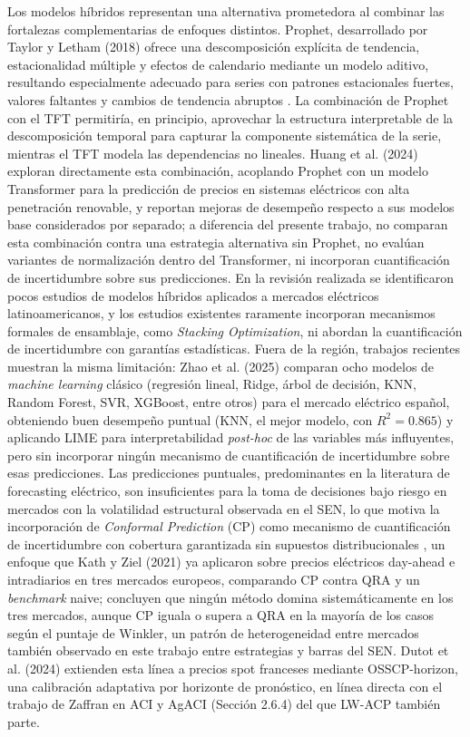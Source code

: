 Los modelos híbridos representan una alternativa prometedora al combinar las fortalezas complementarias de enfoques distintos. Prophet, desarrollado por Taylor y Letham (2018) \cite{Prophet} ofrece una descomposición explícita de tendencia, estacionalidad múltiple y efectos de calendario mediante un modelo aditivo, resultando especialmente adecuado para series con patrones estacionales fuertes, valores faltantes y cambios de tendencia abruptos \cite{Prophet}. La combinación de Prophet con el TFT permitiría, en principio, aprovechar la estructura interpretable de la descomposición temporal para capturar la componente sistemática de la serie, mientras el TFT modela las dependencias no lineales. Huang et al. (2024) \cite{ProphetTransformers} exploran directamente esta combinación, acoplando Prophet con un modelo Transformer para la predicción de precios en sistemas eléctricos con alta penetración renovable, y reportan mejoras de desempeño respecto a sus modelos base considerados por separado; a diferencia del presente trabajo, no comparan esta combinación contra una estrategia alternativa sin Prophet, no evalúan variantes de normalización dentro del Transformer, ni incorporan cuantificación de incertidumbre sobre sus predicciones. En la revisión realizada se identificaron pocos estudios de modelos híbridos aplicados a mercados eléctricos latinoamericanos, y los estudios existentes raramente incorporan mecanismos formales de ensamblaje, como \textit{Stacking Optimization}, ni abordan la cuantificación de incertidumbre con garantías estadísticas. Fuera de la región, trabajos recientes muestran la misma limitación: Zhao et al. (2025) \cite{Zhao2025LIME} comparan ocho modelos de \textit{machine learning} clásico (regresión lineal, Ridge, árbol de decisión, KNN, Random Forest, SVR, XGBoost, entre otros) para el mercado eléctrico español, obteniendo buen desempeño puntual (KNN, el mejor modelo, con $R^2=0.865$) y aplicando LIME para interpretabilidad \textit{post-hoc} de las variables más influyentes, pero sin incorporar ningún mecanismo de cuantificación de incertidumbre sobre esas predicciones. Las predicciones puntuales, predominantes en la literatura de forecasting eléctrico, son insuficientes para la toma de decisiones bajo riesgo en mercados con la volatilidad estructural observada en el SEN, lo que motiva la incorporación de \textit{Conformal Prediction} (CP) como mecanismo de cuantificación de incertidumbre con cobertura garantizada sin supuestos distribucionales \cite{ConformalPrediction}, un enfoque que Kath y Ziel (2021) \cite{KathZiel2021} ya aplicaron sobre precios eléctricos day-ahead e intradiarios en tres mercados europeos, comparando CP contra QRA y un \textit{benchmark} naive; concluyen que ningún método domina sistemáticamente en los tres mercados, aunque CP iguala o supera a QRA en la mayoría de los casos según el puntaje de Winkler, un patrón de heterogeneidad entre mercados también observado en este trabajo entre estrategias y barras del SEN. Dutot et al. (2024) \cite{Dutot2024} extienden esta línea a precios spot franceses mediante OSSCP-horizon, una calibración adaptativa por horizonte de pronóstico, en línea directa con el trabajo de Zaffran en ACI y AgACI (Sección 2.6.4) del que LW-ACP también parte.

